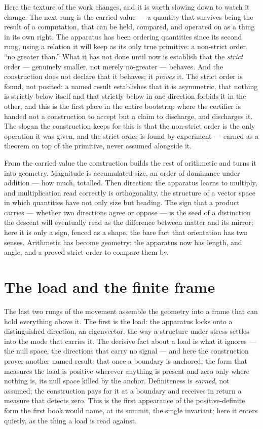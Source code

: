 Here the texture of the work changes, and it is worth slowing down to watch it change. The next rung is the
carried value --- a quantity that survives being the result of a computation, that can be held, compared,
and operated on as a thing in its own right. The apparatus has been ordering quantities since its second
rung, using a relation it will keep as its only true primitive: a non-strict order, ``no greater than.''
What it has not done until now is establish that the \emph{strict} order --- genuinely smaller, not merely
no-greater --- behaves. And the construction does not declare that it behaves; it \emph{proves} it. The
strict order is found, not posited: a named result establishes that it is asymmetric, that nothing is
strictly below itself and that strictly-below in one direction forbids it in the other, and this is the
first place in the entire bootstrap where the certifier is handed not a construction to accept but a claim
to discharge, and discharges it. The slogan the construction keeps for this is that the non-strict order is
the only operation it was given, and the strict order is found by experiment --- earned as a theorem on top
of the primitive, never assumed alongside it.

From the carried value the construction builds the rest of arithmetic and turns it into geometry. Magnitude
is accumulated size, an order of dominance under addition --- how much, totalled. Then direction: the
apparatus learns to multiply, and multiplication read correctly is orthogonality, the structure of a
vector space in which quantities have not only size but heading. The sign that a product carries ---
whether two directions agree or oppose --- is the seed of a distinction the descent will eventually read as
the difference between matter and its mirror; here it is only a sign, fenced as a shape, the bare fact that
orientation has two senses. Arithmetic has become geometry: the apparatus now has length, and angle, and a
proved strict order to compare them by.

\section{The load and the finite frame}
\label{se:load-finite-frame}

The last two rungs of the movement assemble the geometry into a frame that can hold everything above it.
The first is the load: the apparatus locks onto a distinguished direction, an eigenvector, the way a
structure under stress settles into the mode that carries it. The decisive fact about a load is what it
ignores --- the null space, the directions that carry no signal --- and here the construction proves
another named result: that once a boundary is anchored, the form that measures the load is positive
wherever anything is present and zero only where nothing is, its null space killed by the anchor.
Definiteness is \emph{earned}, not assumed; the construction pays for it at a boundary and receives in
return a measure that detects zero. This is the first appearance of the positive-definite form the first
book would name, at its summit, the single invariant; here it enters quietly, as the thing a load is read
against.

